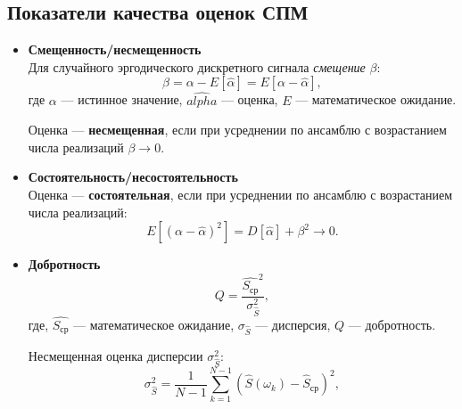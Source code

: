\documentclass[a4paper, 14pt]{extarticle}
\begin{document}
\subsection{Показатели качества оценок СПМ}
\begin{itemize}
    \item \textbf{Смещенность/несмещенность}\\
        Для случайного эргодического дискретного сигнала \textit{смещение} $\beta$:
        \begin{equation}
            \beta = \alpha - E[\hat{\alpha}] = E[\alpha - \hat{\alpha}],
        \end{equation}
        где $\alpha$ --- истинное значение, $\hat{alpha}$ --- оценка, $E$ --- математическое ожидание.

        Оценка --- \textbf{несмещенная}, если при усреднении по ансамблю с возрастанием числа реализаций $\beta \to 0$.
    \item \textbf{Состоятельность/несостоятельность}\\
        Оценка --- \textbf{состоятельная}, если при усреднении по ансамблю с возрастанием числа реализаций:
        \begin{equation}
            E[{(\alpha - \hat{\alpha})}^2] = D[\hat{\alpha}] + \beta^2 \to 0.
        \end{equation}
    \item \textbf{Добротность}
        \begin{equation}
            Q = \frac{\hat{S_\text{ср}}^2}{\sigma_{\hat{S}}^2},
        \end{equation}
        где, $\hat{S_\text{ср}}$ --- математическое ожидание, $\sigma_{\hat{S}}$ --- дисперсия, $Q$ --- добротность.

        Несмещенная оценка дисперсии $\sigma_{\hat{S}}^2$:
        \begin{equation}
        \sigma_{\hat{S}}^2 = \frac{1}{N-1} \sum_{k=1}^{N-1} {\left( \hat{S}(\omega_k) - \hat{S}_\text{ср} \right)}^2,
        \end{equation}


\end{itemize}
\end{document}

